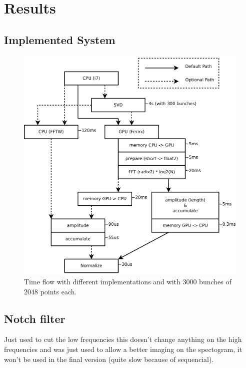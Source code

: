 %

\chapter{Results}

\section{Implemented System}

\begin{figure}[H]
\caption{Time flow with different implementations and with 3000 bunches of 
2048 points each.}
\centering
\includegraphics[scale=0.3]{PC-flow.pdf}
\end{figure}


\section{Notch filter}

Just used to cut the low frequencies this doesn't change anything on the high frequencies and was just used to allow a better imaging on the spectogram, it won't be used in the final version (quite slow because of sequencial).


